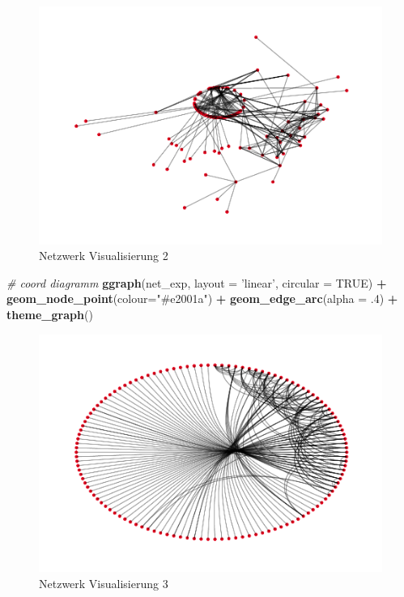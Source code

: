 \documentclass[
  12 pt,
]{article}
\newenvironment{Shaded}{\begin{snugshade}}{\end{snugshade}}
\newcommand{\CommentTok}[1]{\textcolor[rgb]{0.56,0.35,0.01}{\textit{#1}}}
\newcommand{\DataTypeTok}[1]{\textcolor[rgb]{0.13,0.29,0.53}{#1}}
\newcommand{\FloatTok}[1]{\textcolor[rgb]{0.00,0.00,0.81}{#1}}
\newcommand{\KeywordTok}[1]{\textcolor[rgb]{0.13,0.29,0.53}{\textbf{#1}}}
\newcommand{\NormalTok}[1]{#1}
\newcommand{\OperatorTok}[1]{\textcolor[rgb]{0.81,0.36,0.00}{\textbf{#1}}}
\newcommand{\OtherTok}[1]{\textcolor[rgb]{0.56,0.35,0.01}{#1}}
\newcommand{\StringTok}[1]{\textcolor[rgb]{0.31,0.60,0.02}{#1}}
\begin{document}
\begin{figure}
\centering
\includegraphics{Assignment_files/figure-latex/unnamed-chunk-3-1.pdf}
\caption{Netzwerk Visualisierung 2}
\end{figure}

\begin{Shaded}
\begin{Highlighting}[]
\CommentTok{# coord diagramm}
\KeywordTok{ggraph}\NormalTok{(net_exp, }\DataTypeTok{layout =} \StringTok{'linear'}\NormalTok{, }\DataTypeTok{circular =} \OtherTok{TRUE}\NormalTok{) }\OperatorTok{+}\StringTok{ }
\StringTok{  }\KeywordTok{geom_node_point}\NormalTok{(}\DataTypeTok{colour=}\StringTok{"#e2001a"}\NormalTok{) }\OperatorTok{+}
\StringTok{  }\KeywordTok{geom_edge_arc}\NormalTok{(}\DataTypeTok{alpha =} \FloatTok{.4}\NormalTok{) }\OperatorTok{+}
\StringTok{  }\KeywordTok{theme_graph}\NormalTok{()}
\end{Highlighting}
\end{Shaded}

\begin{figure}
\centering
\includegraphics{Assignment_files/figure-latex/unnamed-chunk-4-1.pdf}
\caption{Netzwerk Visualisierung 3}
\end{figure}
\end{document}
